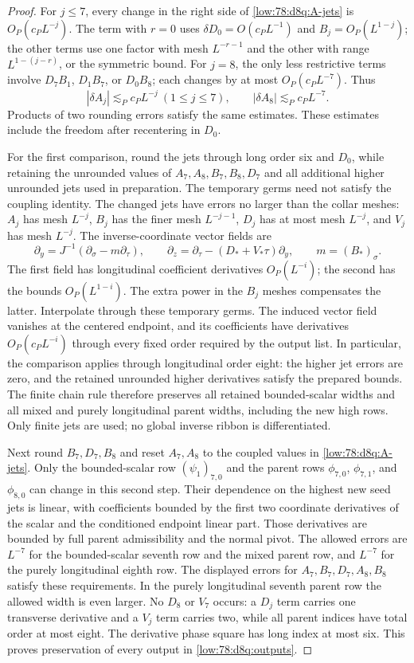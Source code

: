 \documentclass[11pt]{amsart}
\theoremstyle{definition}
\theoremstyle{remark}
\numberwithin{equation}{section}
\begin{document}
\begin{proof}
For $j\le7$, every change in the right side of \eqref{low:78:d8q:A-jets} is $O_P(c_PL^{-j})$. The term with $r=0$ uses $\delta D_0=O(c_PL^{-1})$ and $B_j=O_P(L^{1-j})$; the other terms use one factor with mesh $L^{-r-1}$ and the other with range $L^{1-(j-r)}$, or the symmetric bound. For $j=8$, the only less restrictive terms involve $D_7B_1$, $D_1B_7$, or $D_0B_8$; each changes by at most $O_P(c_PL^{-7})$. Thus
\[
|\delta A_j|\lesssim_Pc_PL^{-j}\ (1\le j\le7),\qquad |\delta A_8|\lesssim_Pc_PL^{-7}.
\]
Products of two rounding errors satisfy the same estimates. These estimates include the freedom after recentering in $D_0$.

For the first comparison, round the jets through long order six and $D_0$, while retaining the unrounded values of $A_7,A_8,B_7,B_8,D_7$ and all additional higher unrounded jets used in preparation. The temporary germs need not satisfy the coupling identity. The changed jets have errors no larger than the collar meshes: $A_j$ has mesh $L^{-j}$, $B_j$ has the finer mesh $L^{-j-1}$, $D_j$ has at most mesh $L^{-j}$, and $V_j$ has mesh $L^{-j}$. The inverse-coordinate vector fields are
\[
\partial_y=J^{-1}(\partial_\sigma-m\partial_\tau),\qquad \partial_z=\partial_\tau-(D_*+V_*\tau)\partial_y,\qquad m=(B_*)_\sigma.
\]
The first field has longitudinal coefficient derivatives $O_P(L^{-i})$; the second has the bounds $O_P(L^{1-i})$. The extra power in the $B_j$ meshes compensates the latter. Interpolate through these temporary germs. The induced vector field vanishes at the centered endpoint, and its coefficients have derivatives $O_P(c_PL^{-i})$ through every fixed order required by the output list. In particular, the comparison applies through longitudinal order eight: the higher jet errors are zero, and the retained unrounded higher derivatives satisfy the prepared bounds. The finite chain rule therefore preserves all retained bounded-scalar widths and all mixed and purely longitudinal parent widths, including the new high rows. Only finite jets are used; no global inverse ribbon is differentiated.

Next round $B_7,D_7,B_8$ and reset $A_7,A_8$ to the coupled values in \eqref{low:78:d8q:A-jets}. Only the bounded-scalar row $(\psi_1)_{7,0}$ and the parent rows $\phi_{7,0}$, $\phi_{7,1}$, and $\phi_{8,0}$ can change in this second step. Their dependence on the highest new seed jets is linear, with coefficients bounded by the first two coordinate derivatives of the scalar and the conditioned endpoint linear part. Those derivatives are bounded by full parent admissibility and the normal pivot. The allowed errors are $L^{-7}$ for the bounded-scalar seventh row and the mixed parent row, and $L^{-7}$ for the purely longitudinal eighth row. The displayed errors for $A_7,B_7,D_7,A_8,B_8$ satisfy these requirements. In the purely longitudinal seventh parent row the allowed width is even larger. No $D_8$ or $V_7$ occurs: a $D_j$ term carries one transverse derivative and a $V_j$ term carries two, while all parent indices have total order at most eight. The derivative phase square has long index at most six. This proves preservation of every output in \eqref{low:78:d8q:outputs}.


\end{proof}
\end{document}
